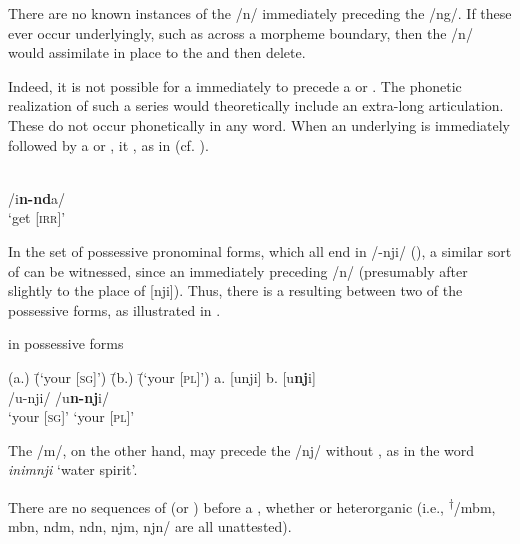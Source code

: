 There are no known instances of the   /n/ immediately preceding the    /ng/. If these ever occur underlyingly, such as across a morpheme boundary, then the  /n/ would  assimilate in place to the    and then delete.

  Indeed, it is not possible for a  immediately to precede a    or . The phonetic realization of such a series would theoretically include an extra-long  articulation. These do not occur phonetically in any word. When an underlying  is immediately followed by a    or , it , as in  (cf. ).

  \ea%
    \label{ex:phon:28a}
\gll \normalfont[i\textbf{nd}a]\\
/i\textbf{n-nd}a/\\
\glt ‘get [\textsc{irr}]’
  \z
  
  In the set of  possessive pronominal forms, which all end in /-nji/ (), a similar sort of  can be witnessed, since an immediately preceding /n/  (presumably after  slightly to the  place of [nji]). Thus, there is a resulting  between two of the possessive forms, as illustrated in .

\newpage

\ea%
    \label{ex:phon:28b}
           in possessive forms\\
\begin{tabbing}    
{(a.)} \= {(‘your [\textsc{sg}]’)} \= {(b.)} \= {(‘your [\textsc{pl}]’)}\kill
 {a.} \> {[unji]} \> {b.} \> {[u\textbf{nj}i]}\\
 { } \> {/u-nji/} \> { } \> {/u\textbf{n-nj}i/}\\
{ } \> {‘your [\textsc{sg}]’}   \> { } \> {‘your [\textsc{pl}]’}
\end{tabbing}
  \z

  The   /m/, on the other hand, may precede the   /nj/ without , as in the word \textit{inimnji} ‘water spirit’.

  There are no sequences of    (or ) before a , whether  or heterorganic (i.e., \textsuperscript{†}/mbm, mbn, ndm, ndn, njm, njn/ are all unattested).

